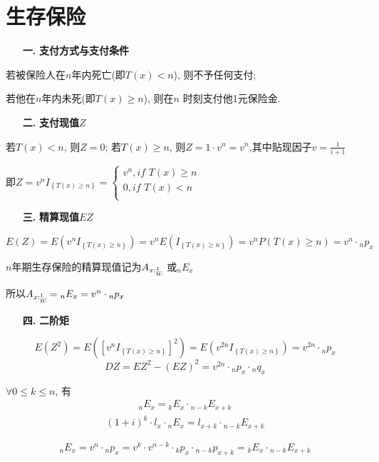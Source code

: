 \documentclass[a4paper,10pt]{ctexbook}
\makeatletter
\newcommand{\hei}{\CJKfamily{hei}}      %
\DeclareRobustCommand{\annu}[1]{_{%
    \def\arraystretch{0}%
    \setlength\arraycolsep{1pt}%
    \setlength\arrayrulewidth{.2pt}%
    \begin{array}[b]{@{}c|}\hline
        \\[\arraycolsep]%
        \scriptstyle #1%
    \end{array}%
}}
\makeatother
\begin{document}
\section{生存保险}
\begin{itemize}
    \item[{\bf\hei 一.}]{\bf\hei 支付方式与支付条件}
\end{itemize}

若被保险人在$n$年内死亡(即$T(x)<n$), 则不予任何支付;

若他在$n$年内未死(即$T(x)\geqslant n$), 则在$n$ 时刻支付他1元保险金.
\begin{itemize}
    \item[{\bf\hei 二.}]{\bf\hei 支付现值$Z$}
\end{itemize}

若$T(x)<n$, 则$Z=0$; 若$T(x)\geqslant n$, 则$Z=1\cdot v^n=v^n$,其中贴现因子$v=\frac{1}{i+1}$

即$Z=v^nI_{\left\{ T\left( x \right) \geqslant n \right\}}=\left\{ \begin{array}{c}
        v^n,if\,\,T\left( x \right) \geqslant n \\
        0,if\,\,T\left( x \right) <n            \\
    \end{array} \right.$
\begin{itemize}
    \item[{\bf\hei 三.}]{\bf\hei 精算现值$EZ$}
\end{itemize}

$E\left( Z \right) =E\left( v^nI_{\left\{ T\left( x \right) \geqslant n \right\}} \right) =v^nE\left( I_{\left\{ T\left( x \right) \geqslant n \right\}} \right)
    =v^nP\left( T\left( x \right) \geqslant n \right) =v^n\cdot{}_np_x$

$n$年期生存保险的精算现值记为$A_{x:\annu{n}^1}$ 或$_nE_x$

所以$A_{x:\annu{n}^1} = {}_nE_x=v^n\cdot{}_np_x$
\begin{itemize}
    \item[{\bf\hei 四.}]{\bf\hei 二阶矩}
\end{itemize}

$$E\left( Z^2 \right) =E\left( \left[ v^nI_{\left\{ T\left( x \right) \geqslant n \right\}} \right] ^2 \right) =E\left( v^{2n}I_{\left\{ T\left( x \right) \geqslant n \right\}} \right) =v^{2n}\cdot{}_np_x$$
$$DZ=EZ^2-\left( EZ \right) ^2=v^{2n}\cdot{}_np_x\cdot{}_nq_x$$

\begin{proposition}
    $\forall 0\leqslant k\leqslant n$, 有
    \begin{align}\label{1}
        _nE_x={}_kE_x\cdot {}_{n-k}E_{x+k}
    \end{align}
    \begin{align}\label{2}
        (1+i)^k\cdot l_x\cdot{}_nE_x=l_{x+k}\cdot {}_{n-k}E_{x+k}
    \end{align}
\end{proposition}
\proof
$$_nE_x=v^n\cdot {}_np_x=v^k\cdot v^{n-k}\cdot {}_kp_x\cdot {}_{n-k}p_{x+k}={}_kE_x\cdot {}_{n-k}E_{x+k}$$
\end{document}
